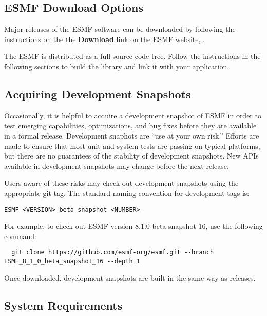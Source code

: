
\subsection{ESMF Download Options}

Major releases of the ESMF software can be downloaded by following
the instructions on the the {\bf Download} link on the ESMF
website, .

The ESMF is distributed as a full source code tree.
Follow the instructions in the following sections
to build the library and link it with your application.

\subsection{Acquiring Development Snapshots}
Occasionally, it is helpful to acquire a development snapshot of ESMF
in order to test emerging capabilities, optimizations, and bug fixes
before they are available in a formal release.  Development snaphots
are ``use at your own risk.'' Efforts are made to ensure that most unit
and system tests are passing on typical platforms, but there are no
guarantees of the stability of development snapshots. New APIs available
in development snapshots may change before the next release.

Users aware of these risks may check out development snapshots
using the appropriate git tag.  The standard naming convention
for development tags is:

\begin{verbatim}
ESMF_<VERSION>_beta_snapshot_<NUMBER>
\end{verbatim}

For example, to check out ESMF version 8.1.0 beta snapshot 16, use the
following command:

\begin{verbatim}
  git clone https://github.com/esmf-org/esmf.git --branch ESMF_8_1_0_beta_snapshot_16 --depth 1
\end{verbatim}

Once downloaded, development snapshots are built in the same way as releases.

\subsection{System Requirements}
\label{sec:systemreq}


